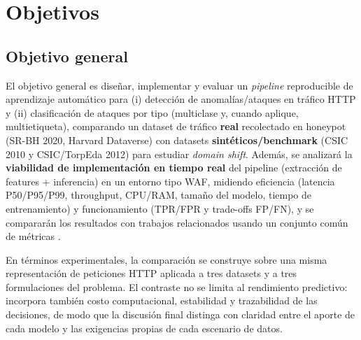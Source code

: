 \documentclass[12pt,oneside]{report}
\begin{document}
\section{Objetivos}
\subsection{Objetivo general}

El objetivo general es diseñar, implementar y evaluar un \textit{pipeline} reproducible de aprendizaje automático para
(i) detección de anomalías/ataques en tráfico HTTP y (ii) clasificación de ataques por tipo (multiclase y, cuando aplique, multietiqueta),
comparando un dataset de tráfico \textbf{real} recolectado en honeypot (SR-BH 2020, Harvard Dataverse) con datasets \textbf{sintéticos/benchmark}
(CSIC 2010 y CSIC/TorpEda 2012) para estudiar \textit{domain shift}.
Además, se analizará la \textbf{viabilidad de implementación en tiempo real} del pipeline (extracción de features + inferencia) en un entorno tipo WAF,
midiendo eficiencia (latencia P50/P95/P99, throughput, CPU/RAM, tamaño del modelo, tiempo de entrenamiento) y funcionamiento (TPR/FPR y trade-offs FP/FN),
y se compararán los resultados con trabajos relacionados usando un conjunto común de métricas \cite{srbh_paper,ocswaf_zenodo,riverol_2024,fang_2024,zhou_2024,saito_pr_auc,chicco_mcc}.

En términos experimentales, la comparación se construye sobre una misma representación de peticiones HTTP aplicada a tres datasets y a tres formulaciones del problema. El contraste no se limita al rendimiento predictivo: incorpora también costo computacional, estabilidad y trazabilidad de las decisiones, de modo que la discusión final distinga con claridad entre el aporte de cada modelo y las exigencias propias de cada escenario de datos.
\end{document}
